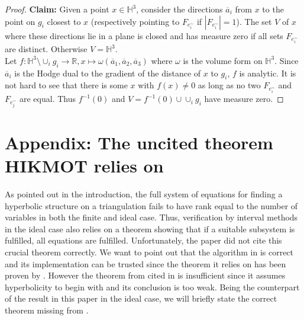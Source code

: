 \documentclass[utopia,fullpage]{nmd/article}
\newcommand\R{\mathbb R}
\renewcommand\H{\mathbb H}
\begin{document}
\begin{proof}
{\bf Claim:} Given a point $x\in\H^3$, consider the directions $\overline{a}_i$ from $x$ to the point on $g_i$ closest to $x$ (respectively pointing to $F_{e^\sim_i}$ if $|F_{e^\sim_i}|=1$). The set $V$ of $x$ where these directions lie in a plane is closed and has measure zero if all sets $F_{e^\sim_i}$ are distinct. Otherwise $V=\H^3$.\\
Let $f:\H^3\setminus \cup_i g_i\to \R, x\mapsto \omega(\overline{a}_1,\overline{a}_2,\overline{a}_3)$ where $\omega$ is the volume form on $\H^3$. Since $\overline{a}_i$ is the Hodge dual to the gradient of the distance of $x$ to $g_i$, $f$ is analytic. It is not hard to see that there is some $x$ with $f(x)\not = 0$ as long as no two $F_{e^\sim_i}$ and $F_{e^\sim_j}$ are equal. Thus $f^{-1}(0)$ and $V=f^{-1}(0)\cup \cup_i g_i$ have measure zero.
\end{proof}



\section{Appendix: The uncited theorem HIKMOT relies on} \label{sec:hikmotGap}

As pointed out in the introduction, the full system of equations for finding a hyperbolic structure on a triangulation fails to have rank equal to the number of variables in both the finite and ideal case. Thus, verification by interval methods in the ideal case also relies on a theorem showing that if a suitable subsystem is fulfilled, all equations are fulfilled. Unfortunately, the paper \cite{hikmot} did not cite this crucial theorem correctly. We want to point out that the algorithm in \cite{hikmot} is correct and its implementation can be trusted since the theorem it relies on has been proven by \cite[Lemma~2.4]{moser}. However the theorem from \cite{NeumannZagier} cited in \cite{hikmot} is insufficient since it assumes hyperbolicity to begin with and its conclusion is too weak. Being the counterpart of the result in this paper in the ideal case, we will briefly state the correct theorem missing from \cite{hikmot}.
\end{document}
